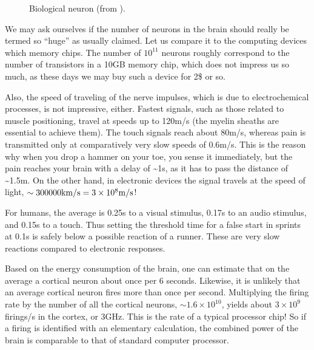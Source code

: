 \documentclass[letterpaper,10pt,english]{jupyterBook}
\let\sphinxpxdimen\pdfpxdimen\else\newdimen\sphinxpxdimen
\begin{document}
\begin{figure}[htbp]
\centering
\capstart

\noindent\sphinxincludegraphics[width=450\sphinxpxdimen]{{neuron-structure}.jpg}
\caption{Biological neuron (from ).}\label{\detokenize{docs/intro:neuron-fig}}\end{figure}

\sphinxAtStartPar
We may ask ourselves if the number of neurons in the brain should really be termed so “huge” as usually claimed. Let us compare it to the computing devices which memory chips. The number of \(10^{11}\) neurons roughly correspond to the number of transistors in a 10GB memory chip, which does not impress us so much, as these days we may buy such a device for 2\$ or so.

\sphinxAtStartPar
Also, the speed of traveling of the nerve impulses, which is due to electrochemical processes, is not impressive, either. Fastest signals, such as those related to muscle positioning, travel at speeds up to 120m/s (the myelin sheaths are essential to achieve them). The touch signals reach about 80m/s, whereas pain is transmitted only at comparatively very slow speeds of 0.6m/s. This is the reason why when you drop a hammer on your toe, you sense it immediately, but the pain reaches your brain with a delay of \textasciitilde{}1s, as it has to pass the distance of \textasciitilde{}1.5m. On the other hand, in electronic devices the signal travels at the speed of light, \(\sim 300000{\rm km/s}=3\times 10^{8}{\rm m/s}\)!

\sphinxAtStartPar
For humans, the average  is 0.25s to a visual stimulus, 0.17s to an audio stimulus, and 0.15s to a touch. Thus setting the threshold time for a false start in sprints at 0.1s is safely below a possible reaction of a runner. These are very slow reactions compared to electronic responses.

\sphinxAtStartPar
Based on the energy consumption of the brain, one can estimate that on the average a cortical neuron  about once per 6 seconds. Likewise, it is unlikely that an average cortical neuron fires more than once per second. Multiplying the firing rate by the number of all the cortical neurons, \(\sim 1.6 \times 10^{10}\), yields about \(3 \times 10^{9}\) firings/s in the cortex, or 3GHz. This is the rate of a typical processor chip! So if a firing is identified with an elementary calculation, the combined power of the brain is comparable to that of standard computer processor.
\end{document}
